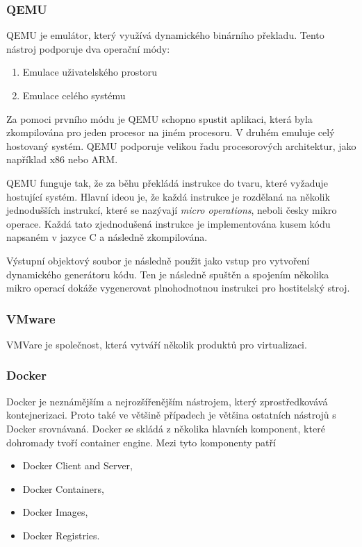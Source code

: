 \subsubsection{QEMU}
QEMU je emulátor, který využívá dynamického binárního překladu. Tento nástroj podporuje dva operační módy:

\begin{enumerate}
    \item Emulace uživatelského prostoru
    \item Emulace celého systému
\end{enumerate}

Za pomoci prvního módu je QEMU schopno spustit aplikaci, která byla zkompilována pro jeden procesor na jiném procesoru. V druhém emuluje celý hostovaný systém. QEMU podporuje velikou řadu procesorových architektur, jako například x86 nebo ARM. 

QEMU funguje tak, že za běhu překládá instrukce do tvaru, které vyžaduje hostující systém. Hlavní ideou je, že každá instrukce je rozdělaná na několik jednodušších instrukcí, které se nazývají \textit{micro operations}, neboli česky mikro operace. Každá tato zjednodušená instrukce je implementována kusem kódu napsaném v jazyce C a následně zkompilována. 

Výstupní objektový soubor je následně použit jako vstup pro vytvoření dynamického generátoru kódu. Ten je následně spuštěn a spojením několika mikro operací dokáže vygenerovat plnohodnotnou instrukci pro hostitelský stroj.\cite{chiueh2005survey}\cite{bellard2005qemu}


\subsubsection{VMware}

VMVare je společnost, která vytváří několik produktů pro virtualizaci. 


\subsubsection{Docker} 
Docker je neznámějším a nejrozšířenějším nástrojem, který zprostředkovává kontejnerizaci. Proto také ve většině případech je většina ostatních nástrojů s Docker srovnávaná. Docker se skládá z několika hlavních komponent, které dohromady tvoří container engine. Mezi tyto komponenty patří

\begin{itemize}
    \item Docker Client and Server,
    \item Docker Containers,
    \item Docker Images,
    \item Docker Registries.
\end{itemize}


